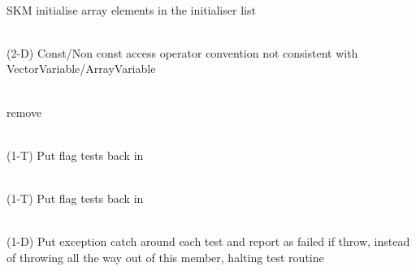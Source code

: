 \begin{DoxyRefList}
\item[Member \doxylink{classcsmp_1_1_tensor_variable_3_012_u_01_4_ad7bfa3c522958e0854d9eba862e361ce}{csmp\+::Tensor\+Variable\texorpdfstring{$<$}{<} 2U \texorpdfstring{$>$}{>}\+::Tensor\+Variable} ()]\hfill \\
\label{todo__todo000189}%
%
SKM initialise array elements in the initialiser list  
\item[Class \doxylink{classcsmp_1_1_tensor_variable_3_013_u_01_4}{csmp\+::Tensor\+Variable\texorpdfstring{$<$}{<} 3U \texorpdfstring{$>$}{>}} ]\hfill \\
\label{todo__todo000032}%
%
(2-\/D) Const/\+Non const access operator convention not consistent with Vector\+Variable/\+Array\+Variable  
\item[Member \doxylink{classcsmp_1_1_tensor_variable_3_013_u_01_4_a9d8dcc0d84512432e5d4e930c32443be}{csmp\+::Tensor\+Variable\texorpdfstring{$<$}{<} 3U \texorpdfstring{$>$}{>}\+::Resize} (uint32\+\_\+t, double new\+Value=std\+::numeric\+\_\+limits$<$ double $>$\+::quiet\+\_\+\+Na\+N())]\hfill \\
\label{todo__todo000033}%
%
remove  
\item[Class \doxylink{classcsmp_1_1_tensor_variable___test}{csmp\+::Tensor\+Variable\+\_\+\+Test} ]\hfill \\
\label{todo__todo000243}%
%
(1-\/T) Put flag tests back in  
\item[Class \doxylink{classcsmp_1_1_tensor_variable___test2}{csmp\+::Tensor\+Variable\+\_\+\+Test2} ]\hfill \\
\label{todo__todo000244}%
%
(1-\/T) Put flag tests back in  
\item[Member \doxylink{classcsmp_1_1_test_suite_a843bc2d137a1885706f093f36bac8ed9}{csmp\+::Test\+Suite\+::run} ()]\hfill \\
\label{todo__todo000254}%
%
(1-\/D) Put exception catch around each test and report as failed if throw, instead of throwing all the way out of this member, halting test routine  
\item[Member \doxylink{classcsmp_1_1_thermal_visitor_aa869eeec7d556b382a67db630584a798}{csmp\+::Thermal\+Visitor\texorpdfstring{$<$}{<} dim \texorpdfstring{$>$}{>}\+::Set\+Initial\+Properties} (\doxylink{classcsmp_1_1_model}{Model$<$ dim $>$} \texorpdfstring{$\ast$}{*}model)]\hfill \\
\label{todo__todo000224}%

\end{DoxyRefList}
